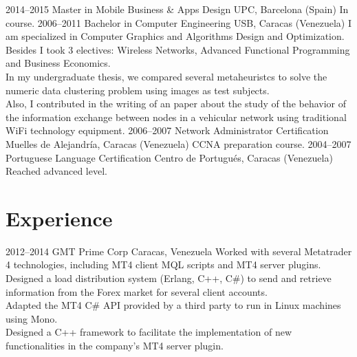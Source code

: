 \documentclass[]{friggeri-cv} %
\begin{document}
\begin{entrylist}
\entry
{2014--2015}
{Master {\normalfont in Mobile Business \& Apps Design}}
{UPC, Barcelona (Spain)}
{In course.}
\entry
{2006--2011}
{Bachelor {\normalfont in Computer Engineering}}
{USB, Caracas (Venezuela)}
{I am specialized in Computer Graphics and Algorithms Design and Optimization.
Besides I took 3 electives: Wireless Networks, Advanced Functional Programming
and Business Economics.
\\
In my undergraduate thesis, we compared several metaheuristcs to solve the
numeric data clustering problem using images as test subjects.
\\
Also, I contributed in the writing of an paper about the study of the behavior
of the information exchange between nodes in a vehicular network
using traditional WiFi technology equipment.}
\entry
{2006--2007}
{Network Administrator Certification}
{Muelles de Alejandría, Caracas (Venezuela)}
{CCNA preparation course.}
\entry
{2004--2007}
{Portuguese Language Certification}
{Centro de Portugués, Caracas (Venezuela)}
{Reached advanced level.}
\end{entrylist}


\section{Experience}

\begin{entrylist}
\entry
{2012--2014}
{GMT Prime Corp}
{Caracas, Venezuela}
{Worked with several Metatrader 4 technologies, including MT4 client MQL
scripts and MT4 server plugins.
\\
Designed a load distribution system (Erlang, C++, C\#) to send and retrieve
information from the Forex market for several client accounts.
\\
Adapted the MT4 C\# API provided by a third party to run in Linux machines
using Mono.
\\   
Designed a C++ framework to facilitate the implementation of new
functionalities in the company's MT4 server plugin.}
\end{entrylist}
\end{document}
